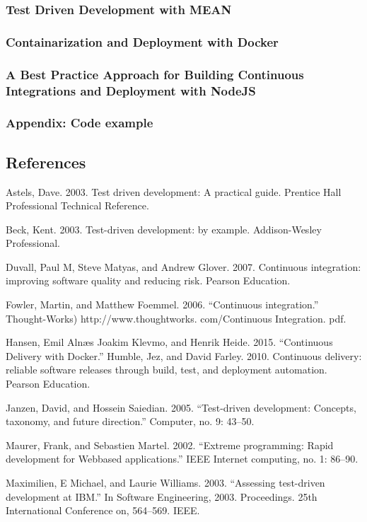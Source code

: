 \subsubsection{Test Driven Development with MEAN}
\subsubsection{Containarization and Deployment with Docker}
\subsubsection{A Best Practice Approach for Building Continuous Integrations and Deployment with NodeJS}
\subsubsection{Appendix: Code example}

\subsection{References}

Astels, Dave. 2003. Test driven development: A practical guide. Prentice Hall Professional Technical Reference.

Beck, Kent. 2003. Test-driven development: by example. Addison-Wesley Professional.

Duvall, Paul M, Steve Matyas, and Andrew Glover. 2007. Continuous integration: improving software quality and reducing risk. Pearson Education.

Fowler, Martin, and Matthew Foemmel. 2006. “Continuous integration.” Thought-Works) http://www.thoughtworks. com/Continuous Integration. pdf.

Hansen, Emil Alnæs Joakim Klevmo, and Henrik Heide. 2015. “Continuous Delivery with Docker.” Humble, Jez, and David Farley. 2010. Continuous delivery: reliable software releases through build, test, and deployment automation. Pearson Education.

Janzen, David, and Hossein Saiedian. 2005. “Test-driven development: Concepts, taxonomy, and future direction.” Computer, no. 9: 43–50.

Maurer, Frank, and Sebastien Martel. 2002. “Extreme programming: Rapid development for Webbased applications.” IEEE Internet computing, no. 1: 86–90.

Maximilien, E Michael, and Laurie Williams. 2003. “Assessing test-driven development at IBM.” In Software Engineering, 2003. Proceedings. 25th International Conference on, 564–569. IEEE.

